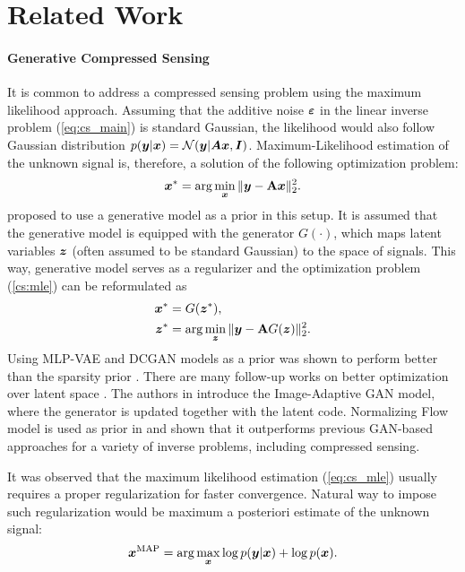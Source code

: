 \section{Related Work} \label{sec:related_works}


\paragraph{Generative Compressed Sensing} \label{sec:related_gen_cs}
It is common to address a compressed sensing problem using the maximum likelihood approach. Assuming that the additive noise ${\bm{\varepsilon}}$ in the linear inverse problem (\ref{eq:cs_main}) is standard Gaussian, the likelihood would also follow Gaussian distribution $p({\bm{y}}|{\bm{x}}) = \mathcal{N}({\bm{y}}| {\bm{A}}{\bm{x}}, {\bm{I}})$. Maximum-Likelihood estimation of the unknown signal is, therefore, a solution of the following optimization problem:
\begin{equation}\label{cs:mle}
    \vx^* = \arg\min_\vx \| \vy - \mathbf{A}\vx\|_2^2.
\end{equation}
\cite{Bora2017-as} proposed to use a generative model as a prior in this setup. It is assumed that the generative model is equipped with the generator $G(\cdot)$, which maps latent variables ${\bm{z}}$ (often assumed to be standard Gaussian) to the space of signals. This way, generative model serves as a regularizer and the optimization problem (\ref{cs:mle}) can be reformulated as
\begin{align}
    \vx^* &= G(\vz^*),\\
    \vz^* &= \arg \min_{\vz} \|\vy - \mathbf{A} G(\vz)\|_2^2. \label{eq:cs_mle}
\end{align}
Using MLP-VAE and DCGAN models as a prior was shown to perform better than the sparsity prior \cite{Bora2017-as}. There are many follow-up works on better optimization over latent space \cite{daras_intermediate_2021,lei_inverting_2019}. The authors in \cite{Hussein2020-yk} introduce the Image-Adaptive GAN model, where the generator is updated together with the latent code. Normalizing Flow model is used as prior in \cite{Asim2019-lv} and shown that it outperforms previous GAN-based approaches for a variety of inverse problems, including compressed sensing. 

It was observed that the maximum likelihood estimation (\eqref{eq:cs_mle}) usually requires a proper regularization for faster convergence. Natural way to impose such regularization would be maximum a posteriori estimate of the unknown signal:
\begin{equation}
    {\bm{x}}^{\text{MAP}} = \arg \max_{\bm{x}} \log p({\bm{y}}|{\bm{x}}) + \log p({\bm{x}}).
\end{equation}

